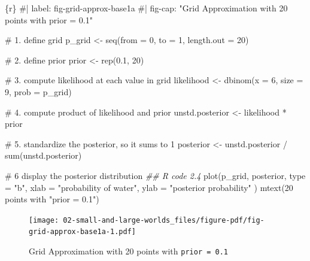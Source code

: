 \documentclass[
  letterpaper,
  DIV=11,
  numbers=noendperiod]{scrreprt}
\newenvironment{Shaded}{\begin{snugshade}}{\end{snugshade}}
\newcommand{\AttributeTok}[1]{\textcolor[rgb]{0.40,0.45,0.13}{#1}}
\newcommand{\CommentTok}[1]{\textcolor[rgb]{0.37,0.37,0.37}{#1}}
\newcommand{\DecValTok}[1]{\textcolor[rgb]{0.68,0.00,0.00}{#1}}
\newcommand{\DocumentationTok}[1]{\textcolor[rgb]{0.37,0.37,0.37}{\textit{#1}}}
\newcommand{\FloatTok}[1]{\textcolor[rgb]{0.68,0.00,0.00}{#1}}
\newcommand{\FunctionTok}[1]{\textcolor[rgb]{0.28,0.35,0.67}{#1}}
\newcommand{\InformationTok}[1]{\textcolor[rgb]{0.37,0.37,0.37}{#1}}
\newcommand{\NormalTok}[1]{\textcolor[rgb]{0.00,0.23,0.31}{#1}}
\newcommand{\OtherTok}[1]{\textcolor[rgb]{0.00,0.23,0.31}{#1}}
\newcommand{\SpecialCharTok}[1]{\textcolor[rgb]{0.37,0.37,0.37}{#1}}
\newcommand{\StringTok}[1]{\textcolor[rgb]{0.13,0.47,0.30}{#1}}
\begin{document}
\begin{Shaded}
\begin{Highlighting}[]
\InformationTok{\textasciigrave{}\textasciigrave{}\textasciigrave{}\{r\}}
\CommentTok{\#| label: fig{-}grid{-}approx{-}base1a}
\CommentTok{\#| fig{-}cap: "Grid Approximation with 20 points with \textasciigrave{}prior = 0.1\textasciigrave{}"}

\CommentTok{\# 1. define grid}
\NormalTok{p\_grid }\OtherTok{\textless{}{-}} \FunctionTok{seq}\NormalTok{(}\AttributeTok{from =} \DecValTok{0}\NormalTok{, }\AttributeTok{to =} \DecValTok{1}\NormalTok{, }\AttributeTok{length.out =} \DecValTok{20}\NormalTok{)}

\CommentTok{\# 2. define prior}
\NormalTok{prior }\OtherTok{\textless{}{-}} \FunctionTok{rep}\NormalTok{(}\FloatTok{0.1}\NormalTok{, }\DecValTok{20}\NormalTok{)}

\CommentTok{\# 3. compute likelihood at each value in grid}
\NormalTok{likelihood }\OtherTok{\textless{}{-}} \FunctionTok{dbinom}\NormalTok{(}\AttributeTok{x =} \DecValTok{6}\NormalTok{, }\AttributeTok{size =} \DecValTok{9}\NormalTok{, }\AttributeTok{prob =}\NormalTok{ p\_grid)}

\CommentTok{\# 4. compute product of likelihood and prior}
\NormalTok{unstd.posterior }\OtherTok{\textless{}{-}}\NormalTok{ likelihood }\SpecialCharTok{*}\NormalTok{ prior}

\CommentTok{\# 5. standardize the posterior, so it sums to 1}
\NormalTok{posterior }\OtherTok{\textless{}{-}}\NormalTok{ unstd.posterior }\SpecialCharTok{/} \FunctionTok{sum}\NormalTok{(unstd.posterior)}

\CommentTok{\# 6 display the posterior distribution}
\DocumentationTok{\#\# R code 2.4}
\FunctionTok{plot}\NormalTok{(p\_grid, posterior,}
  \AttributeTok{type =} \StringTok{"b"}\NormalTok{,}
  \AttributeTok{xlab =} \StringTok{"probability of water"}\NormalTok{, }\AttributeTok{ylab =} \StringTok{"posterior probability"}
\NormalTok{)}
\FunctionTok{mtext}\NormalTok{(}\StringTok{\textquotesingle{}20 points with "prior = 0.1"\textquotesingle{}}\NormalTok{)}
\InformationTok{\textasciigrave{}\textasciigrave{}\textasciigrave{}}
\end{Highlighting}
\end{Shaded}

\begin{figure}[H]

{\centering \texttt{[image: 02-small-and-large-worlds\_files/figure-pdf/fig-grid-approx-base1a-1.pdf]}

}

\caption{\label{fig-grid-approx-base1a}Grid Approximation with 20 points
with \texttt{prior\ =\ 0.1}}

\end{figure}
\end{document}
